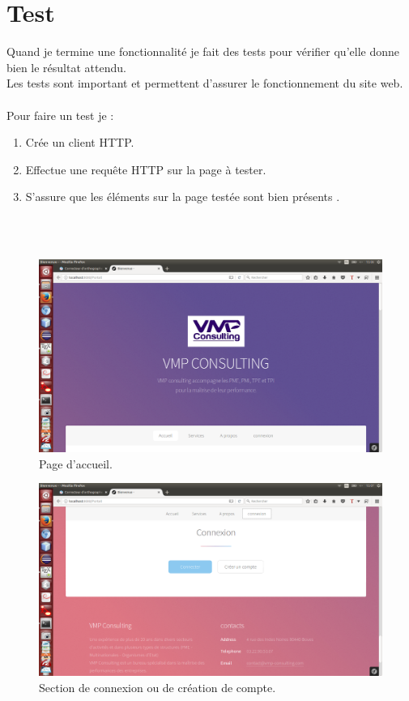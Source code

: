 \documentclass[12pt]{article}
\begin{document}
\newpage

\section{Test}

Quand je termine une fonctionnalité je fait des tests pour vérifier qu'elle donne bien le résultat attendu.\\
Les tests sont important et permettent d'assurer le fonctionnement du site web.\\ \\ 
Pour faire un test je :
\begin{enumerate}
 \item  Crée un client HTTP.

 \item   Effectue une requête HTTP sur la page à tester.

\item    S'assure que les éléments sur la page testée sont bien présents .
\end{enumerate}\\
\\

\begin{figure}[htp]
  \centering
  \includegraphics[width=12cm]{t1.png}
  \caption{Page d'accueil.}
  \label{fig:une-autre-image}
\end{figure}

\begin{figure}[htp]
  \centering
  \includegraphics[width=12cm]{t2.png}
  \caption{Section de connexion ou de création de compte.}
  \label{fig:une-autre-image}
\end{figure}
\end{document}
